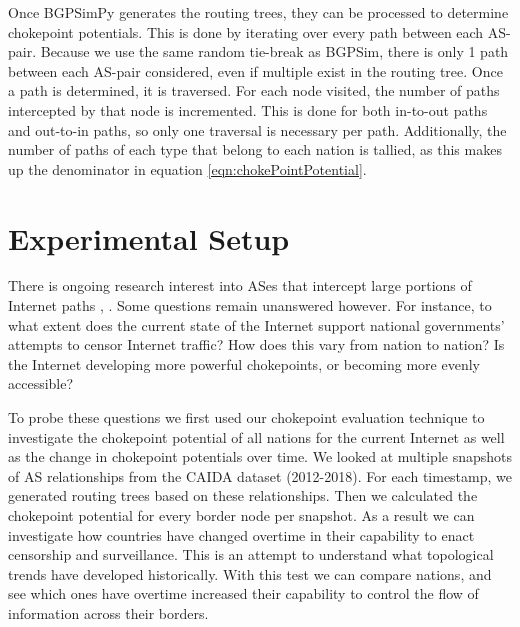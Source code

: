 \documentclass{article}
\begin{document}
\begin{multicols}{2}
\par
Once BGPSimPy generates the routing trees, they can be processed to determine chokepoint potentials. This is done by iterating over every path between each AS-pair. Because
we use the same random tie-break as BGPSim, there is only 1 path between each AS-pair considered, even if multiple exist in the routing tree. Once a path is determined, it is
traversed. For each node visited, the number of paths intercepted by that node is incremented. This is done for both in-to-out paths and out-to-in paths, so only one traversal is
necessary per path. Additionally, the number of paths of each type that belong to each nation is tallied, as this makes up the denominator in equation \ref{eqn:chokePointPotential}.

\section{Experimental Setup}

There is ongoing research interest into ASes that intercept large portions of Internet paths \cite{throats}, \cite{decoy}. Some questions remain unanswered however. For instance, to what
extent does the current state of the Internet support national governments' attempts to censor Internet traffic? How does this vary from nation to nation? Is the Internet developing more
powerful chokepoints, or becoming more evenly accessible?
\par
To probe these questions we first used our chokepoint evaluation technique to investigate the chokepoint potential of all nations for the current Internet as well as the
change in chokepoint potentials over time. We looked at multiple snapshots of AS relationships from the CAIDA dataset (2012-2018).
For each timestamp, we generated routing trees based on these relationships. Then we calculated the chokepoint potential for every border node per snapshot. As a result we can investigate
how countries have changed overtime in their capability to enact censorship and surveillance. This is an attempt to understand what topological trends have developed historically.
With this test we can compare nations, and see which ones have overtime increased their capability to control the flow of information across their borders.


\end{multicols}
\end{document}
